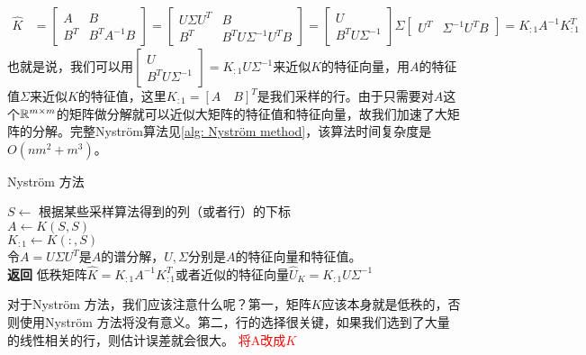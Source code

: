 \begin{align*}
    \hat{K} & = \begin{bmatrix}
            A & B \\
            B^T & B^T A^{-1} B
          \end{bmatrix} 
          = \begin{bmatrix}
              U\Sigma U^T & B \\
            B^T & B^T U \Sigma^{-1} U^T B
          \end{bmatrix}
          = \begin{bmatrix}
            U \\
            B^T U \Sigma^{-1}
          \end{bmatrix} \Sigma
          \begin{bmatrix}
            U^T & \Sigma^{-1}U^T B
          \end{bmatrix}
          = K_{:1}A^{-1}K_{:1}^T
\end{align*}
也就是说，我们可以用$\begin{bmatrix} U \\ B^T U \Sigma^{-1} \end{bmatrix} = K_{:1}U\Sigma^{-1}$来近似$K$的特征向量，用$A$的特征值$\Sigma$来近似$K$的特征值，这里$K_{:1} = [A \quad B]^T$是我们采样的行。由于只需要对$A$这个$\mathbb{R}^{m\times m}$的矩阵做分解就可以近似大矩阵的特征值和特征向量，故我们加速了大矩阵的分解。完整Nyström算法见\ref{alg: Nyström method}，该算法时间复杂度是$O(nm^2 + m^3)$。
\begin{algorithm}
    \caption{Nyström 方法}\label{alg: Nyström method}
    $S \gets$ 根据某些采样算法得到的列（或者行）的下标 \\
    $A \gets K(S,S)$ \\
    $K_{:1} \gets K(:,S)$ \\
    令$A = U\Sigma U^T$是$A$的谱分解，$U,\Sigma$分别是$A$的特征向量和特征值。\\
    \textbf{返回} 低秩矩阵$\hat{K} = K_{:1}A^{-1}K_{:1}^T$或者近似的特征向量$\hat{U}_K = K_{:1}U\Sigma^{-1}$
\end{algorithm} 
对于Nyström 方法，我们应该注意什么呢？第一，矩阵$K$应该本身就是低秩的，否则使用Nyström 方法将没有意义。第二，行的选择很关键，如果我们选到了大量的线性相关的行，则估计误差就会很大。
\textcolor{red}{将A改成$K$}
